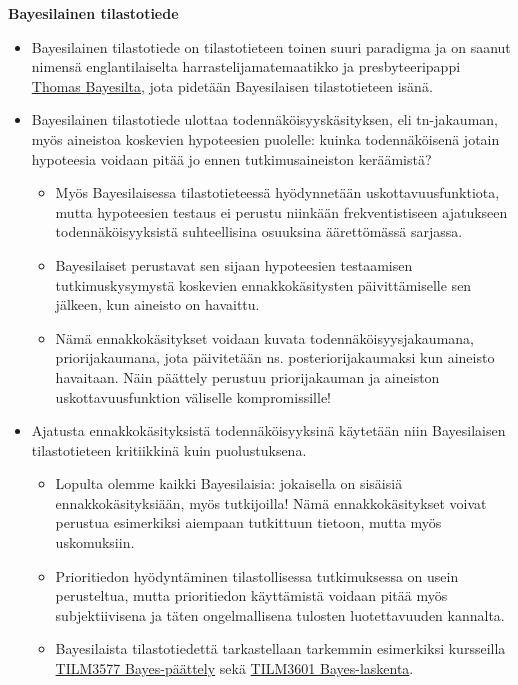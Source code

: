 \documentclass[
]{book}
\providecommand{\tightlist}{%
  \setlength{\itemsep}{0pt}\setlength{\parskip}{0pt}}
\begin{document}
\hfill\break

\textbf{Bayesilainen tilastotiede}

\begin{itemize}
\tightlist
\item
  Bayesilainen tilastotiede on tilastotieteen toinen suuri paradigma ja on saanut nimensä englantilaiselta harrastelijamatemaatikko ja presbyteeripappi \href{https://fi.wikipedia.org/wiki/Bayesil\%C3\%A4inen_tilastotiede}{Thomas Bayesilta}, jota pidetään Bayesilaisen tilastotieteen isänä.
\item
  Bayesilainen tilastotiede ulottaa todennäköisyyskäsityksen, eli tn-jakauman, myös aineistoa koskevien hypoteesien puolelle: kuinka todennäköisenä jotain hypoteesia voidaan pitää jo ennen tutkimusaineiston keräämistä?

  \begin{itemize}
  \tightlist
  \item
    Myös Bayesilaisessa tilastotieteessä hyödynnetään uskottavuusfunktiota, mutta hypoteesien testaus ei perustu niinkään frekventistiseen ajatukseen todennäköisyyksistä suhteellisina osuuksina äärettömässä sarjassa.
  \item
    Bayesilaiset perustavat sen sijaan hypoteesien testaamisen tutkimuskysymystä koskevien ennakkokäsitysten päivittämiselle sen jälkeen, kun aineisto on havaittu.
  \item
    Nämä ennakkokäsitykset voidaan kuvata todennäköisyysjakaumana, priorijakaumana, jota päivitetään ns. posteriorijakaumaksi kun aineisto havaitaan. Näin päättely perustuu priorijakauman ja aineiston uskottavuusfunktion väliselle kompromissille!
  \end{itemize}
\item
  Ajatusta ennakkokäsityksistä todennäköisyyksinä käytetään niin Bayesilaisen tilastotieteen kritiikkinä kuin puolustuksena.

  \begin{itemize}
  \tightlist
  \item
    Lopulta olemme kaikki Bayesilaisia: jokaisella on sisäisiä ennakkokäsityksiään, myös tutkijoilla! Nämä ennakkokäsitykset voivat perustua esimerkiksi aiempaan tutkittuun tietoon, mutta myös uskomuksiin.
  \item
    Prioritiedon hyödyntäminen tilastollisessa tutkimuksessa on usein perusteltua, mutta prioritiedon käyttämistä voidaan pitää myös subjektiivisena ja täten ongelmallisena tulosten luotettavuuden kannalta.
  \item
    Bayesilaista tilastotiedettä tarkastellaan tarkemmin esimerkiksi kursseilla \href{https://opas.peppi.utu.fi/fi/opintojakso/TILM3577/6969}{TILM3577 Bayes-päättely} sekä \href{https://opas.peppi.utu.fi/fi/opintojakso/TILM3601/21033}{TILM3601 Bayes-laskenta}.
  \end{itemize}
\end{itemize}
\end{document}
